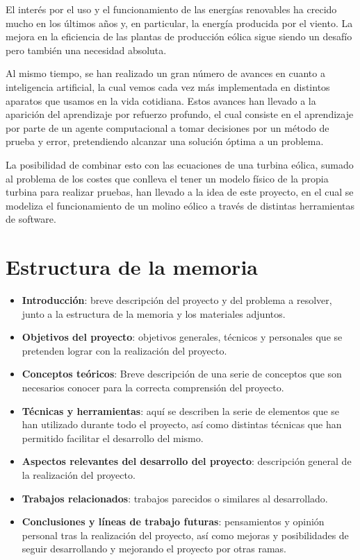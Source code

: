 
El interés por el uso y el funcionamiento de las energías renovables ha crecido mucho en los últimos años y, en particular, la energía producida por el viento.
La mejora en la eficiencia de las plantas de producción eólica sigue siendo un desafío pero también una necesidad absoluta.

Al mismo tiempo, se han realizado un gran número de avances en cuanto a inteligencia artificial\cite{wiki:IA}, la cual vemos cada vez más implementada en distintos aparatos que usamos en la vida cotidiana. Estos avances han llevado a la aparición del aprendizaje por refuerzo profundo\cite{RL}, el cual consiste en el aprendizaje por parte de un agente computacional a tomar decisiones por un método de prueba y error, pretendiendo alcanzar una solución óptima a un problema.

La posibilidad de combinar esto con las ecuaciones de una turbina eólica, sumado al problema de los costes que conlleva el tener un modelo físico de la propia turbina para realizar pruebas, han llevado a la idea de este proyecto, en el cual se modeliza el funcionamiento de un molino eólico a través de distintas herramientas de software.


\section{Estructura de la memoria}

\begin{itemize}
    \item \textbf{Introducción}: breve descripción del proyecto y del problema a resolver, junto a la estructura de la memoria y los materiales adjuntos.
    \item \textbf{Objetivos del proyecto}: objetivos generales, técnicos y personales que se pretenden lograr con la realización del proyecto.
    \item \textbf{Conceptos teóricos}: Breve descripción de una serie de conceptos que son necesarios conocer para la correcta comprensión del proyecto.
    \item \textbf{Técnicas y herramientas}: aquí se describen la serie de elementos que se han utilizado durante todo el proyecto, así como distintas técnicas que han permitido facilitar el desarrollo del mismo.
    \item \textbf{Aspectos relevantes del desarrollo del proyecto}: descripción general de la realización del proyecto.
    \item \textbf{Trabajos relacionados}: trabajos parecidos o similares al desarrollado.
    \item \textbf{Conclusiones y líneas de trabajo futuras}: pensamientos y opinión personal tras la realización del proyecto, así como mejoras y posibilidades de seguir desarrollando y mejorando el proyecto por otras ramas.
\end{itemize}

